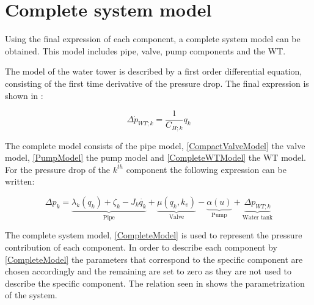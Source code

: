 \section{Complete system model} 
\label{CompleteSystemModel}

Using the final expression of each component, a complete system model can be obtained. This model includes pipe, valve, pump components and the WT. 

The model of the water tower is described by a first order differential equation, consisting of the first time derivative of the pressure drop. The final expression is shown in :

\begin{equation}
  \label{CompleteWTModel}
  \Delta {\dot{p}_{WT;k}} = \frac{1}{C_{H;k}} q_k 
\end{equation}

The complete model consists of the pipe model, \eqref{CompactValveModel} the valve model, \eqref{PumpModel} the pump model and \eqref{CompleteWTModel} the WT model. For the pressure drop of the $k^{th}$ component the following expression can be written: 

%

\begin{equation}
\label{CompleteModel}
\Delta p_k = \underbrace{\lambda_k (q_k) + \zeta_k - J_k \dot{q_k}}_\text{Pipe} + \underbrace{\mu (q_k, k_v)}_\text{Valve} - \underbrace{\alpha (u)}_\text{Pump} + \underbrace{\Delta p_{WT;k}}_\text{Water tank}
\end{equation}

The complete system model, \eqref{CompleteModel} is used to represent the pressure contribution of each component. In order to describe each component by \eqref{CompleteModel} the parameters that correspond to the specific component are chosen accordingly and the remaining are set to zero as they are not used to describe the specific component. 
The relation seen in  shows the parametrization of the system.

